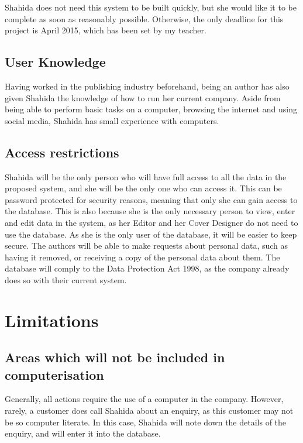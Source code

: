 Shahida does not need this system to be built quickly, but she would like it to be complete as soon as reasonably possible. Otherwise, the only deadline for this project is April 2015, which has been set by my teacher.

\subsection{User Knowledge}

Having worked in the publishing industry beforehand, being an author has also given Shahida the knowledge of how to run her current company. Aside from being able to perform basic tasks on a computer, browsing the internet and using social media, Shahida has small experience with computers.

\subsection{Access restrictions}

Shahida will be the only person who will have full access to all the data in the proposed system, and she will be the only one who can access it. This can be password protected for security reasons, meaning that only she can gain access to the database. This is also because she is the only necessary person to view, enter and edit data in the system, as her Editor and her Cover Designer do not need to use the database. As she is the only user of the database, it will be easier to keep secure. The authors will be able to make requests about personal data, such as having it removed, or receiving a copy of the personal data about them. The database will comply to the Data Protection Act 1998, as the company already does so with their current system.

\section{Limitations}

\subsection{Areas which will not be included in computerisation}
Generally, all actions require the use of a computer in the company. However, rarely, a customer does call Shahida about an enquiry, as this customer may not be so computer literate. In this case, Shahida will note down the details of the enquiry, and will enter it into the database.

